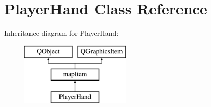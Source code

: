 \hypertarget{class_player_hand}{\section{Player\-Hand Class Reference}
\label{class_player_hand}
}
Inheritance diagram for Player\-Hand\-:\begin{figure}[H]
\begin{center}
\leavevmode
\includegraphics[height=3.000000cm]{class_player_hand}
\end{center}
\end{figure}
